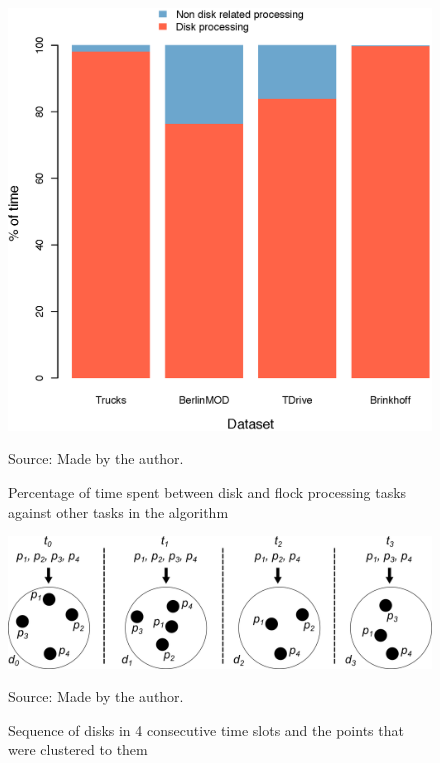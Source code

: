 \begin{figure}[h!]
    \centering
    \caption{Percentage of time spent between disk and flock processing tasks against other tasks in the algorithm}
    \centerline{\includegraphics[width=0.7\linewidth]{images/timeConsumption.eps}}
    \footnotesize{Source: Made by the author.}
    \label{fig:time_consumption}
\end{figure}

\begin{figure}[h!]
    \centering
    \caption{Sequence of disks in 4 consecutive time slots and the points that were clustered to them}
    \centerline{\includegraphics[width=\linewidth]{images/disks_2.png}}
    \footnotesize{Source: Made by the author.}
    \label{fig:disks}
\end{figure}

